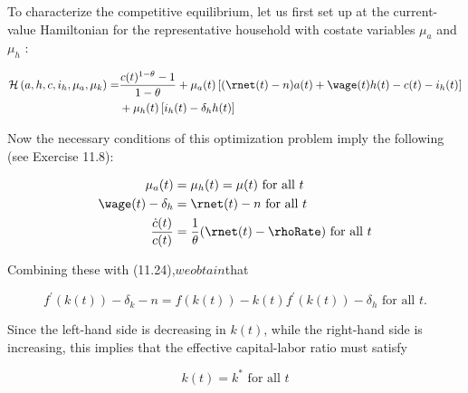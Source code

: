 \documentclass[\topdir/lecture\_notes.tex]{subfiles}
\begin{document}
To characterize the competitive equilibrium, let us first set up at the current-value Hamiltonian for the representative household with costate variables $\mu_a$ and $\mu_h$ :

\[
\begin{aligned}
\mathcal{H}\left(a, h, c, i_{h}, \mu_{a}, \mu_{k}\right)= & \frac{c(t)^{1-\theta}-1}{1-\theta}+\mu_{a}(t)\left[(\rnet(t)-n) a(t)+\wage(t) h(t)-c(t)-i_{h}(t)\right] \\
& +\mu_{h}(t)\left[i_{h}(t)-\delta_{h} h(t)\right]
\end{aligned}
\]

Now the necessary conditions of this optimization problem imply the following (see Exercise 11.8):

\[
\begin{aligned}
\mu_{a}(t) & =\mu_{h}(t)=\mu(t) \text { for all } t \\
\wage(t)-\delta_{h} & =\rnet(t)-n \text { for all } t \\
\frac{\dot{c}(t)}{c(t)} & =\frac{1}{\theta}(\rnet(t)-\rhoRate) \text{ for all } t
\end{aligned}
\]

Combining these with (11.24),$ we obtain $that

\[
f^{\prime}(k(t))-\delta_{k}-n=f(k(t))-k(t) f^{\prime}(k(t))-\delta_{h} \text {$$ for all $$} t .
\]

Since the left-hand side is decreasing in $k(t)$, while the right-hand side is increasing, this implies that the effective capital-labor ratio must satisfy

\[
k(t)=k^{*} \text{ for all } t
\]
\end{document}

